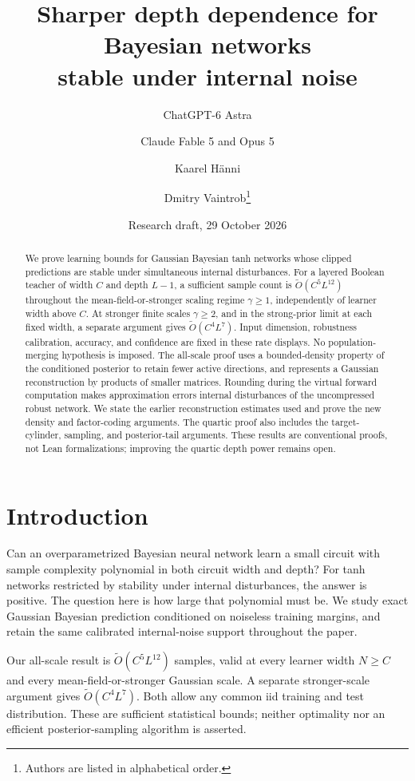 \documentclass[11pt]{article}
\title{Sharper depth dependence for Bayesian networks\protect\\stable under internal noise}
\author{ChatGPT-6 Astra \and Claude Fable 5 and Opus 5 \and Kaarel H\"anni \and Dmitry Vaintrob\thanks{Authors are listed in alphabetical order.}}
\date{Research draft, 29 October 2026}
\begin{document}
\maketitle
\begin{abstract}
We prove learning bounds for Gaussian Bayesian tanh networks whose clipped
predictions are stable under simultaneous internal disturbances. For a
layered Boolean teacher of width $C$ and depth $L-1$, a sufficient sample
count is $\widetilde O(C^5L^{12})$ throughout the mean-field-or-stronger
scaling regime $\gamma\ge1$, independently of learner width above $C$.
At stronger finite scales $\gamma\ge2$, and in the strong-prior limit at
each fixed width, a separate argument gives $\widetilde O(C^4L^7)$.
Input dimension, robustness calibration, accuracy, and confidence are fixed
in these rate displays. No population-merging hypothesis is imposed.
The all-scale proof uses a bounded-density property of the conditioned
posterior to retain fewer active directions, and represents a Gaussian
reconstruction by products of smaller matrices. Rounding during the
virtual forward computation makes approximation errors internal
disturbances of the uncompressed robust network. We state the earlier
reconstruction estimates used and prove the new density and factor-coding
arguments. The quartic proof also includes the target-cylinder, sampling,
and posterior-tail arguments. These results are conventional proofs,
not Lean formalizations; improving the quartic depth power remains open.
\end{abstract}

\section{Introduction}

Can an overparametrized Bayesian neural network learn a small circuit with
sample complexity polynomial in both circuit width and depth? For tanh
networks restricted by stability under internal disturbances, the answer
is positive. The question here is how large that polynomial must be.
We study exact Gaussian Bayesian prediction conditioned on noiseless
training margins, and retain the same calibrated internal-noise support
throughout the paper.

Our all-scale result is $\widetilde O(C^5L^{12})$ samples, valid at every
learner width $N\ge C$ and every mean-field-or-stronger Gaussian scale.
A separate stronger-scale argument gives $\widetilde O(C^4L^7)$.
Both allow any common iid training and test distribution. These are
sufficient statistical bounds; neither optimality nor an efficient
posterior-sampling algorithm is asserted.
\end{document}
